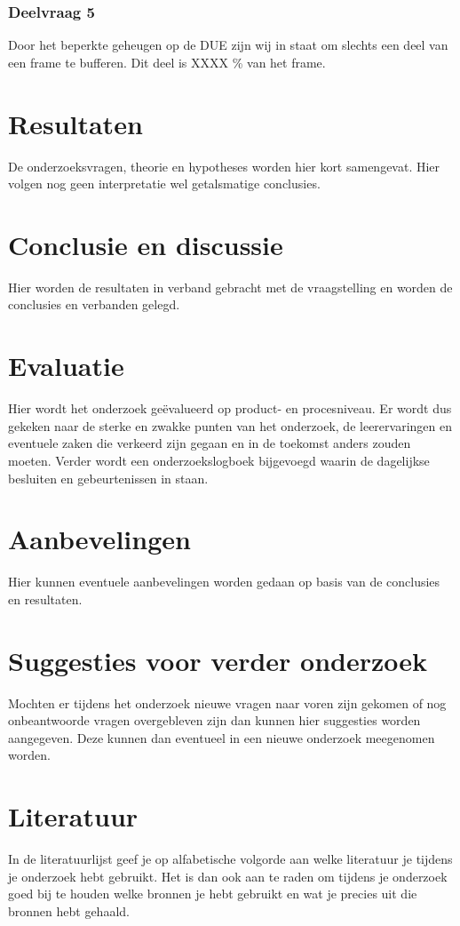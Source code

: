 \documentclass{article}
\begin{document}
\subsubsection{Deelvraag 5}
Door het beperkte geheugen op de DUE zijn wij in staat om slechts een deel van een frame te bufferen. Dit deel is XXXX \% van het frame. 

\section{Resultaten}
De onderzoeksvragen, theorie en hypotheses worden hier kort samengevat. Hier volgen nog geen interpretatie wel getalsmatige conclusies.

\section{Conclusie en discussie}
Hier worden de resultaten in verband gebracht met de vraagstelling en worden de conclusies en verbanden gelegd.

\section{Evaluatie}
Hier wordt het onderzoek geëvalueerd op product- en procesniveau. Er wordt dus gekeken naar de sterke en zwakke punten van het onderzoek, de leerervaringen en eventuele zaken die verkeerd zijn gegaan en in de toekomst anders zouden moeten. Verder wordt een onderzoekslogboek bijgevoegd waarin de dagelijkse besluiten en gebeurtenissen in staan.

\section{Aanbevelingen}
Hier kunnen eventuele aanbevelingen worden gedaan op basis van de conclusies en resultaten.

\section{Suggesties voor verder onderzoek}
Mochten er tijdens het onderzoek nieuwe vragen naar voren zijn gekomen of nog onbeantwoorde vragen overgebleven zijn dan kunnen hier suggesties worden aangegeven. Deze kunnen dan eventueel in een nieuwe onderzoek meegenomen worden.

\section{Literatuur}
In de literatuurlijst geef je op alfabetische volgorde aan welke literatuur je tijdens je onderzoek hebt gebruikt. Het is dan ook aan te raden om tijdens je onderzoek goed bij te houden welke bronnen je hebt gebruikt en wat je precies uit die bronnen hebt gehaald.
\end{document}
